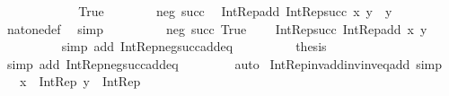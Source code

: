 \begin{isabellebody}
\ \ \ \ \isamarkupfalse%
\isanewline
\ \ \ \ \ \ \isamarkupfalse%
\ True\isanewline
\ \ \ \ \ \ \isamarkupfalse%
\ neg\ succ\ \isamarkupfalse%
\ {\isachardoublequoteopen}Int{\isacharunderscore}{\kern0pt}Rep{\isacharunderscore}{\kern0pt}add\ {\isacharparenleft}{\kern0pt}Int{\isacharunderscore}{\kern0pt}Rep{\isacharunderscore}{\kern0pt}succ\ x{\isacharparenright}{\kern0pt}\ y\ {\isacharequal}{\kern0pt}\ y{\isachardoublequoteclose}\isanewline
\ \ \ \ \ \ \ \ \isamarkupfalse%
\ nat{\isacharunderscore}{\kern0pt}one{\isacharunderscore}{\kern0pt}def\ \isamarkupfalse%
\ simp\isanewline
\ \ \ \ \ \ \isamarkupfalse%
\ \isamarkupfalse%
\ neg\ succ\ True\ \isamarkupfalse%
\ {\isachardoublequoteopen}{\isachardot}{\kern0pt}{\isachardot}{\kern0pt}{\isachardot}{\kern0pt}\ {\isacharequal}{\kern0pt}\ Int{\isacharunderscore}{\kern0pt}Rep{\isacharunderscore}{\kern0pt}succ\ {\isacharparenleft}{\kern0pt}Int{\isacharunderscore}{\kern0pt}Rep{\isacharunderscore}{\kern0pt}add\ x\ y{\isacharparenright}{\kern0pt}{\isachardoublequoteclose}\isanewline
\ \ \ \ \ \ \ \ \isamarkupfalse%
\ {\isacharparenleft}{\kern0pt}simp\ add{\isacharcolon}{\kern0pt}\ Int{\isacharunderscore}{\kern0pt}Rep{\isacharunderscore}{\kern0pt}neg{\isacharunderscore}{\kern0pt}succ{\isacharunderscore}{\kern0pt}add{\isacharunderscore}{\kern0pt}eq{\isacharparenright}{\kern0pt}\isanewline
\ \ \ \ \ \ \isamarkupfalse%
\ \isamarkupfalse%
\ {\isacharquery}{\kern0pt}thesis\ \isamarkupfalse%
\ {\isacharparenleft}{\kern0pt}simp\ add{\isacharcolon}{\kern0pt}\ Int{\isacharunderscore}{\kern0pt}Rep{\isacharunderscore}{\kern0pt}neg{\isacharunderscore}{\kern0pt}succ{\isacharunderscore}{\kern0pt}add{\isacharunderscore}{\kern0pt}eq{\isacharparenright}{\kern0pt}\isanewline
\ \ \ \ \isamarkupfalse%
\isanewline
\ \ \isamarkupfalse%
\ auto\isanewline
{}\isamarkupfalse%
%
\endisatagproof
{\isafoldproof}%
%
\isadelimproof
\isanewline
%
\endisadelimproof
\isanewline
{}\isamarkupfalse%
\ Int{\isacharunderscore}{\kern0pt}Rep{\isacharunderscore}{\kern0pt}inv{\isacharunderscore}{\kern0pt}add{\isacharunderscore}{\kern0pt}inv{\isacharunderscore}{\kern0pt}inv{\isacharunderscore}{\kern0pt}eq{\isacharunderscore}{\kern0pt}add\ {\isacharbrackleft}{\kern0pt}simp{\isacharbrackright}{\kern0pt}{\isacharcolon}{\kern0pt}\isanewline
\ \ \ {\isachardoublequoteopen}x\ {\isacharcolon}{\kern0pt}\ Int{\isacharunderscore}{\kern0pt}Rep{\isachardoublequoteclose}\ {\isachardoublequoteopen}y\ {\isacharcolon}{\kern0pt}\ Int{\isacharunderscore}{\kern0pt}Rep{\isachardoublequoteclose}\isanewline

\end{isabellebody}
